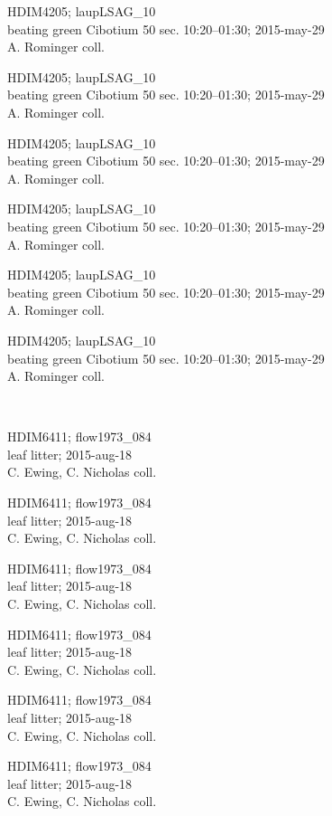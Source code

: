 \documentclass[2pt]{extarticle}
\begin{document}
\noindent
\parbox{0.16\textwidth}{\tiny \raggedright \rule[-0.3\baselineskip]{0pt}{10pt}HDIM4205; laupLSAG\_10\\ beating green Cibotium 50 sec. 10:20--01:30; 2015-may-29\\ A. Rominger coll.}
\parbox{0.16\textwidth}{\tiny \raggedright \rule[-0.3\baselineskip]{0pt}{10pt}HDIM4205; laupLSAG\_10\\ beating green Cibotium 50 sec. 10:20--01:30; 2015-may-29\\ A. Rominger coll.}
\parbox{0.16\textwidth}{\tiny \raggedright \rule[-0.3\baselineskip]{0pt}{10pt}HDIM4205; laupLSAG\_10\\ beating green Cibotium 50 sec. 10:20--01:30; 2015-may-29\\ A. Rominger coll.}
\parbox{0.16\textwidth}{\tiny \raggedright \rule[-0.3\baselineskip]{0pt}{10pt}HDIM4205; laupLSAG\_10\\ beating green Cibotium 50 sec. 10:20--01:30; 2015-may-29\\ A. Rominger coll.}
\parbox{0.16\textwidth}{\tiny \raggedright \rule[-0.3\baselineskip]{0pt}{10pt}HDIM4205; laupLSAG\_10\\ beating green Cibotium 50 sec. 10:20--01:30; 2015-may-29\\ A. Rominger coll.}
\parbox{0.16\textwidth}{\tiny \raggedright \rule[-0.3\baselineskip]{0pt}{10pt}HDIM4205; laupLSAG\_10\\ beating green Cibotium 50 sec. 10:20--01:30; 2015-may-29\\ A. Rominger coll.} \\ 
\vspace{0.001in} 

\noindent
\parbox{0.16\textwidth}{\tiny \raggedright \rule[-0.3\baselineskip]{0pt}{10pt}HDIM6411; flow1973\_084\\ leaf litter; 2015-aug-18\\ C. Ewing, C. Nicholas coll.}
\parbox{0.16\textwidth}{\tiny \raggedright \rule[-0.3\baselineskip]{0pt}{10pt}HDIM6411; flow1973\_084\\ leaf litter; 2015-aug-18\\ C. Ewing, C. Nicholas coll.}
\parbox{0.16\textwidth}{\tiny \raggedright \rule[-0.3\baselineskip]{0pt}{10pt}HDIM6411; flow1973\_084\\ leaf litter; 2015-aug-18\\ C. Ewing, C. Nicholas coll.}
\parbox{0.16\textwidth}{\tiny \raggedright \rule[-0.3\baselineskip]{0pt}{10pt}HDIM6411; flow1973\_084\\ leaf litter; 2015-aug-18\\ C. Ewing, C. Nicholas coll.}
\parbox{0.16\textwidth}{\tiny \raggedright \rule[-0.3\baselineskip]{0pt}{10pt}HDIM6411; flow1973\_084\\ leaf litter; 2015-aug-18\\ C. Ewing, C. Nicholas coll.}
\parbox{0.16\textwidth}{\tiny \raggedright \rule[-0.3\baselineskip]{0pt}{10pt}HDIM6411; flow1973\_084\\ leaf litter; 2015-aug-18\\ C. Ewing, C. Nicholas coll.} \\ 
\vspace{0.001in} 
\end{document}
